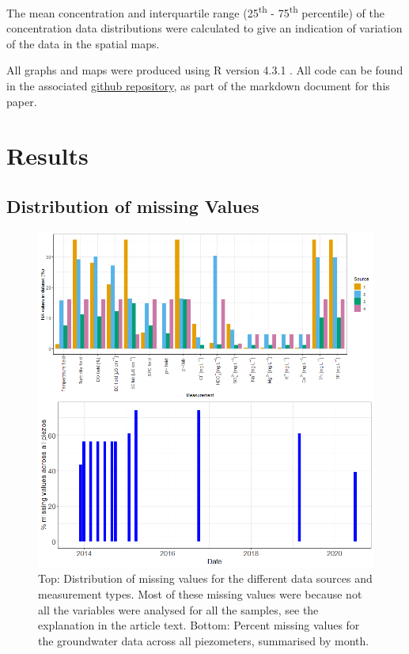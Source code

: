 \documentclass[, manuscript]{copernicus}
\begin{document}
The mean concentration and interquartile range (25\textsuperscript{th} -
75\textsuperscript{th} percentile) of the concentration data
distributions were calculated to give an indication of variation of the
data in the spatial maps.

All graphs and maps were produced using R version 4.3.1 \citep{R2023}.
All code can be found in the associated
\href{https://github.com/WillemVervoort/MuttamaDataPaper}{github
repository}, as part of the markdown document for this paper.

\section{Results}

\subsection{Distribution of missing Values}

\begin{figure}
\includegraphics[width=0.9\linewidth]{Figures/na_count} \caption{Top: Distribution of missing values for the different data sources and measurement types. Most of these missing values were because not all the variables were analysed for all the samples, see the explanation in the article text. Bottom: Percent missing values for the groundwater data across all piezometers, summarised by month.}\label{fig:na-plot}
\end{figure}
\end{document}
